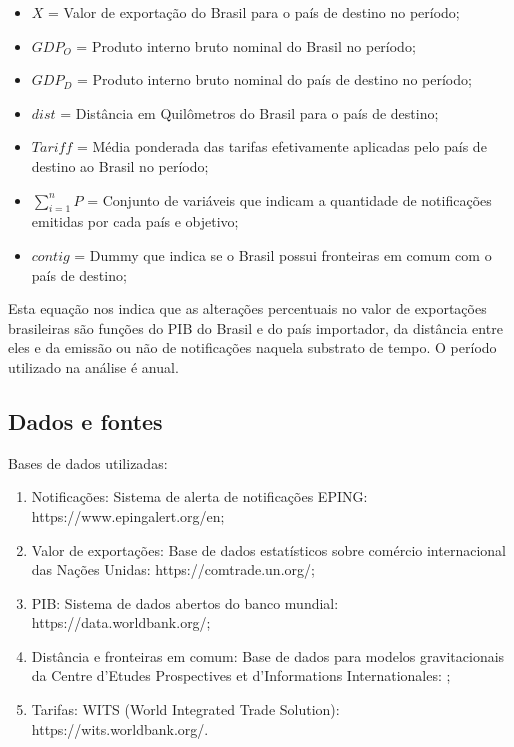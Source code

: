 \documentclass[12pt, a4paper]{article}
\begin{document}
\begin{itemize}
    \item $X$ = Valor de exportação do Brasil para o país de destino no período;
    \item $GDP_{O}$ = Produto interno bruto nominal do Brasil no período;
    \item $GDP_{D}$ = Produto interno bruto nominal do país de destino no período;
    \item $dist$ = Distância em Quilômetros  do Brasil para o país de destino;
    \item $Tariff$ = Média ponderada das tarifas efetivamente aplicadas pelo país de destino ao Brasil no período;
    \item $\sum_{i=1}^{n} P$ = Conjunto de variáveis que indicam a quantidade de notificações emitidas por cada país e objetivo;
    \item $contig$ = Dummy que indica se o Brasil possui fronteiras em comum com o país de destino;
\end{itemize}

Esta equação nos indica que as alterações percentuais no valor de exportações brasileiras são funções do PIB do Brasil e do país importador, da distância entre eles e da emissão ou não de notificações naquela substrato de tempo. O período utilizado na análise é anual.

\subsection{Dados e fontes}

Bases de dados utilizadas:

\begin{enumerate}
    \item Notificações: Sistema de alerta de notificações EPING: https://www.epingalert.org/en;
    \item Valor de exportações: Base de dados estatísticos sobre comércio internacional das Nações Unidas: https://comtrade.un.org/;
    \item PIB: Sistema de dados abertos do banco mundial: https://data.worldbank.org/;
    \item Distância e fronteiras em comum: Base de dados para modelos gravitacionais da Centre d'Etudes Prospectives et d'Informations Internationales: \cite{CEPII};
    \item Tarifas: WITS (World Integrated Trade Solution): https://wits.worldbank.org/.
\end{enumerate}
\end{document}
